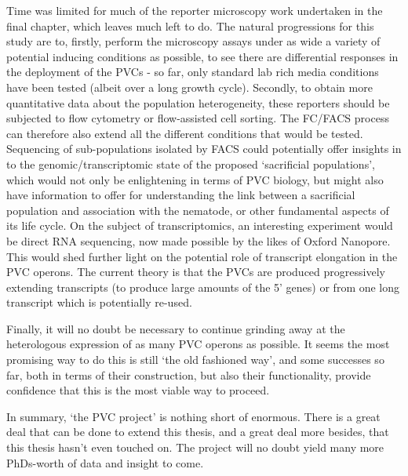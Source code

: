 Time was limited for much of the reporter microscopy work undertaken in the final chapter, which leaves much left to do. The natural progressions for this study are to, firstly, perform the microscopy assays under as wide a variety of potential inducing conditions as possible, to see there are differential responses in the deployment of the PVCs - so far, only standard lab rich media conditions have been tested (albeit over a long growth cycle). Secondly, to obtain more quantitative data about the population heterogeneity, these reporters should be subjected to flow cytometry or flow-assisted cell sorting. The FC/FACS process can therefore also extend all the different conditions that would be tested. Sequencing of sub-populations isolated by FACS could potentially offer insights in to the genomic/transcriptomic state of the proposed `sacrificial populations', which would not only be enlightening in terms of PVC biology, but might also have information to offer for understanding the link between a sacrificial population and association with the nematode, or other fundamental aspects of its life cycle. On the subject of transcriptomics, an interesting experiment would be direct RNA sequencing, now made possible by the likes of Oxford Nanopore. This would shed further light on the potential role of transcript elongation in the PVC operons. The current theory is that the PVCs are produced progressively extending transcripts (to produce large amounts of the 5' genes) or from one long transcript which is potentially re-used.

Finally, it will no doubt be necessary to continue grinding away at the heterologous expression of as many PVC operons as possible. It seems the most promising way to do this is still `the old fashioned way', and some successes so far, both in terms of their construction, but also their functionality, provide confidence that this is the most viable way to proceed.


In summary, `the PVC project' is nothing short of enormous. There is a great deal that can be done to extend this thesis, and a great deal more besides, that this thesis hasn't even touched on. The project will no doubt yield many more PhDs-worth of data and insight to come.

\vspace{1cm}

{\hfill{\Huge\adfclosedflourishleft}\hfill}



